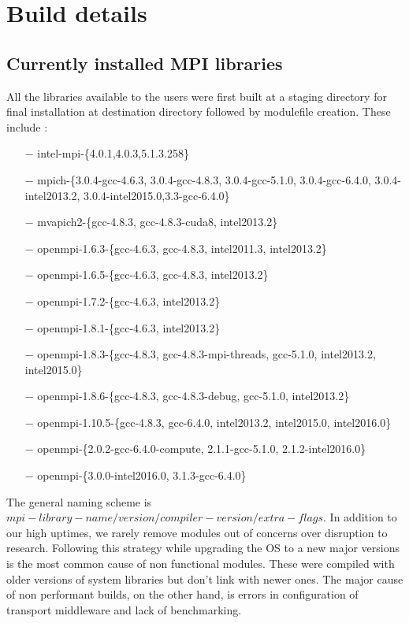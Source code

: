 \documentclass[manuscript,screen]{acmart}
\begin{document}



\appendix
\section{Build details}
\subsection{Currently installed MPI libraries}
All the libraries available to the users were first built at a staging directory
for final installation at destination directory followed by modulefile creation. These include :
\begin{itemize}
	\item[$-$] intel-mpi-\{4.0.1,4.0.3,5.1.3.258\}
	\item[$-$] mpich-\{3.0.4-gcc-4.6.3, 3.0.4-gcc-4.8.3, 3.0.4-gcc-5.1.0, 	3.0.4-gcc-6.4.0, 3.0.4-intel2013.2, 3.0.4-intel2015.0,3.3-gcc-6.4.0\}
	\item[$-$]mvapich2-\{gcc-4.8.3, gcc-4.8.3-cuda8, intel2013.2\}
	\item[$-$]openmpi-1.6.3-\{gcc-4.6.3, gcc-4.8.3, intel2011.3, intel2013.2\}
	\item[$-$]openmpi-1.6.5-\{gcc-4.6.3, gcc-4.8.3, intel2013.2\}
	\item[$-$]openmpi-1.7.2-\{gcc-4.6.3, intel2013.2\}		\item[$-$]openmpi-1.8.1-\{gcc-4.6.3, intel2013.2\}
	\item[$-$]openmpi-1.8.3-\{gcc-4.8.3, gcc-4.8.3-mpi-threads, gcc-5.1.0, 	intel2013.2, intel2015.0\}
	\item[$-$]openmpi-1.8.6-\{gcc-4.8.3, gcc-4.8.3-debug, gcc-5.1.0, intel2013.2\}
	\item[$-$]openmpi-1.10.5-\{gcc-4.8.3, gcc-6.4.0, intel2013.2, intel2015.0, intel2016.0\}
	\item[$-$]openmpi-\{2.0.2-gcc-6.4.0-compute, 2.1.1-gcc-5.1.0, 2.1.2-intel2016.0\}
	\item[$-$]openmpi-\{3.0.0-intel2016.0, 3.1.3-gcc-6.4.0\}
\end{itemize} 
The general naming scheme is  $mpi-library-name/version/compiler-version/extra-flags$. In addition to our high uptimes, we rarely remove modules out of concerns over disruption to research. Following this strategy while upgrading the OS to a new major versions is the most common cause of non functional modules. These were compiled with older versions of system libraries but don't link with newer ones. The major cause of non performant builds, on the other hand, is errors in configuration of transport middleware and lack of benchmarking.
\end{document}
